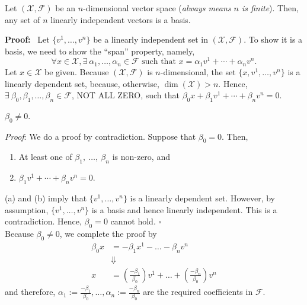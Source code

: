 \begin{thm}
Let $(\mathcal{X},\mathcal{F})$ be an $n$-dimensional vector space (\emph{always means $n$ is finite}). Then, any set of $n$ linearly independent vectors is a basis.
\end{thm} 

\textbf{Proof:}~ Let $\{v^1,\ldots,v^n\}$ be a linearly independent set in $(\mathcal{X}, \mathcal{F})$. To show it is a basis, we need to show the ``span'' property, namely, 
$$\forall x \in \mathcal{X}, \exists~ \alpha_1, \ldots, \alpha_n \in \mathcal{F}   \text{ such that } x=\alpha_1v^1+\cdots+\alpha_nv^n. $$
Let $x\in \mathcal{X}$  be given. Because $(\mathcal{X},\mathcal{F})$ is $n$-dimensional, the set $\{x,v^1,\ldots,v^n\}$ is a linearly dependent set, because, otherwise, $\dim(\mathcal{X})>n$. Hence, $\exists ~ \beta_0,\beta_1,\ldots,\beta_n\in\mathcal{F}$, NOT ALL ZERO, such that $\beta_0x+\beta_1v^1+\cdots+\beta_n v^n=0$.\\

\begin{claim}
$\beta_0 \neq 0$.
\end{claim}

\textit{Proof}: We do a proof by contradiction. Suppose that $\beta_0=0$. Then,
    \begin{enumerate}
        \renewcommand{\labelenumi}{(\alph{enumi})}
        \setlength{\itemsep}{.1cm}
        \item At least one of $\beta_1,\ \ldots,\ \beta_n$ is non-zero, and
        \item $\beta_1v^1+\cdots+\beta_nv^n=0$.
    \end{enumerate}
   (a) and (b) imply that $\{v^1, \ldots,v^n\}$ is a linearly dependent set. However, by assumption, $\{v^1, \ldots,v^n\}$ is a basis and hence linearly independent. This is a contradiction. Hence, $\beta_0=0$ cannot hold. \hfill $\square$ \\
   
Because $\beta_0 \neq 0$, we complete the proof by 
    \begin{align*}
        \beta_0x &= -\beta_1x^1-\ldots-\beta_nv^n\\
        & \Downarrow \\
        x&=\left(\frac{-\beta_1}{\beta_0}\right)v^1+\ldots+\left(\frac{-\beta_n}{\beta_0}\right)v^n
    \end{align*}
    and therefore,  $ \alpha_1 := \frac{-\beta_1}{\beta_0}, \ldots,\alpha_n:=\frac{-\beta_n}{\beta_0}$ are the required coefficients in $\mathcal{F}$. 
    \Qed
    
